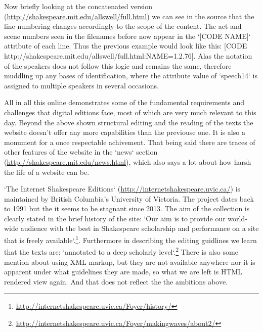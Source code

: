 \documentclass{article}
\begin{document}
Now briefly looking at the concatenated version (\url{http://shakespeare.mit.edu/allswell/full.html}) we can see in the source that the line numbering changes accordingly to the scope of the content. The act and scene numbers seen in the filenames before now appear in the `[CODE NAME]` attribute of each line. Thus the previous example would look like this: [CODE http://shakespeare.mit.edu/allswell/full.html:NAME=1.2.76]. Alas the notation of the speakers does not follow this logic and remains the same, therefore muddling up any bases of identification, where the attribute value of `speech14` is assigned to multiple speakers in several occasions.

All in all this online demonstrates some of the fundamental requirements and challenges that digital editions face, most of which are very much relevant to this day. Beyond the above shown structural editing and the reading of the texts the website doesn't offer any more capabilities than the previouse one. It is also a monument for a once respectable achivement. That being said there are traces of other features of the website in the `news` section (\url{http://shakespeare.mit.edu/news.html}), which also says a lot about how harsh the life of a website can be.   

`The Internet Shakespeare Editions` (\url{http://internetshakespeare.uvic.ca/}) is maintained by British Columbia's University of Victoria. The project dates back to 1991 but the it seems to be stagnant since 2013. The aim of the collection is clearly stated in the brief history of the site: `Our aim is to provide our world-wide audience with the best in Shakespeare scholarship and performance on a site that is freely available`.\footnote{\url{http://internetshakespeare.uvic.ca/Foyer/history/}}. Furthermore in describing the editing guidlines we learn that the texts are: `annotated to a deep scholarly level`.\footnote{\url{http://internetshakespeare.uvic.ca/Foyer/makingwaves/about2/}} There is also some mention about using XML markup, but they are not available anywhere nor it is apparent under what guidelines they are made, so what we are left is HTML rendered view again. And that does not reflect the the ambitions above.
\end{document}
